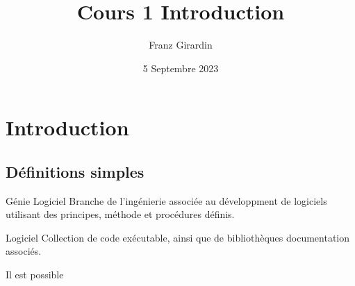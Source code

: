 \documentclass[8pt]{report}
\title{\Huge{Cours 1 Introduction}\\}
\author{\huge{Franz Girardin}}
\date{5 Septembre 2023}
\begin{document}
\maketitle
\pagebreak
\tableofcontents
\pagebreak

\chapter{Introduction}
\section*{Définitions simples}

\begin{Definition*}{Génie Logiciel}{}
    Branche de l'ingénierie associée au développment de logiciels
    utilisant des principes, méthode et procédures définis. 
\end{Definition*}

\begin{Definition}{Logiciel}{}
    Collection de code exécutable, ainsi que de bibliothèques 
    documentation associés.  
\end{Definition}
Il est possible 
\end{document}
